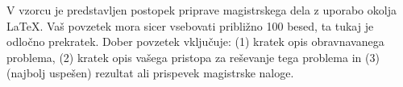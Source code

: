 V vzorcu je predstavljen postopek priprave magistrskega dela z uporabo okolja
\LaTeX. Vaš povzetek mora sicer vsebovati približno 100 besed, ta tukaj je
odločno prekratek. Dober povzetek vključuje: (1) kratek opis obravnavanega
problema, (2) kratek opis vašega pristopa za reševanje tega problema in (3)
(najbolj uspešen) rezultat ali prispevek magistrske naloge.
